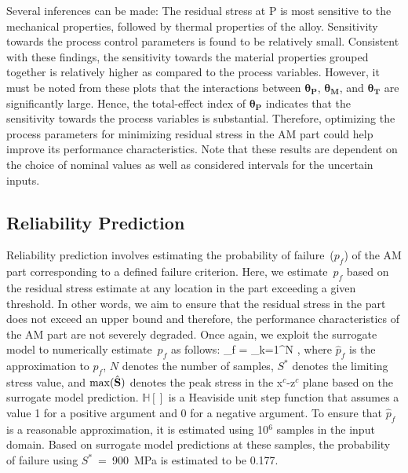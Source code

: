 %
Several inferences can be made: The residual stress at P is most sensitive to the mechanical properties, followed 
by thermal properties of the alloy. Sensitivity towards the process control parameters is found to be relatively small. 
Consistent with these findings, the sensitivity towards the material properties grouped together is relatively
higher as compared to the process variables. 
However, it must be noted from these plots that the interactions between $\bm{\theta_P}$, $\bm{\theta_M}$, and $\bm{\theta_T}$
are significantly large. Hence, the total-effect index of $\bm{\theta_P}$ indicates that the sensitivity towards the 
process variables is substantial. Therefore, optimizing the process parameters for minimizing residual
stress in the AM part could help improve its performance characteristics. 
Note that these results are dependent on the choice of nominal values as well as considered intervals
for the uncertain inputs. 

\subsection{Reliability Prediction}
\label{sub:reliability}

Reliability prediction involves estimating the probability of failure~($p_f$) of the AM part
corresponding to a defined failure criterion. Here, we estimate~$p_f$ based on the residual 
stress estimate at any location in
the part exceeding a given threshold. In other words, we aim to ensure that the residual stress
in the part does not exceed an upper bound and therefore, the performance characteristics of
the AM part are not severely degraded. Once again, we exploit the surrogate model to
numerically estimate~$p_f$ as follows:
%
\be
{}_f = \sum\limits_{k=1}^{N} ,
\ee
\label{eq:pf}
%
where $\hat{p}_f$ is the approximation to $p_f$, $N$ denotes the number of samples, $S^\ast$
denotes the limiting stress value, and $\max(\hat{\mathbf{{S}}})$ denotes the peak stress in the
x$^c$-z$^c$ plane based on the surrogate model prediction. $\mathbb{H}[]$
is a Heaviside unit step function that assumes a value 1 for a positive argument and 0 for
a negative argument.
To ensure that $\hat{p}_f$ is a reasonable approximation, it is estimated
using 10$^6$ samples in the input domain. Based on surrogate model predictions at these samples,
the probability of failure using $S^\ast$~=~900~MPa is estimated to be 0.177. 

